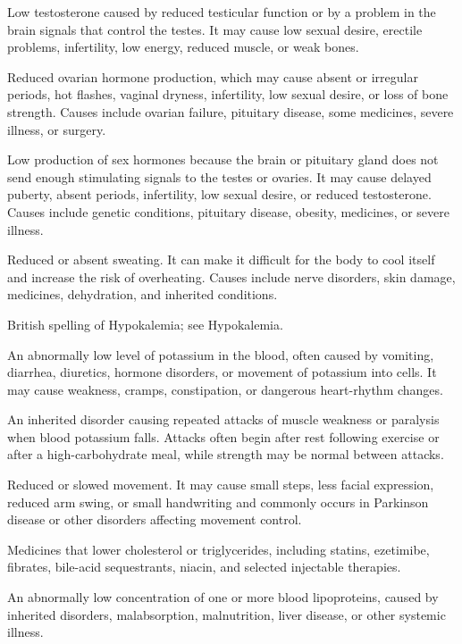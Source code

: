  Low testosterone caused by reduced testicular function or by a problem in the brain signals that control the testes. It may cause low sexual desire, erectile problems, infertility, low energy, reduced muscle, or weak bones.

 Reduced ovarian hormone production, which may cause absent or irregular periods, hot flashes, vaginal dryness, infertility, low sexual desire, or loss of bone strength. Causes include ovarian failure, pituitary disease, some medicines, severe illness, or surgery.

 Low production of sex hormones because the brain or pituitary gland does not send enough stimulating signals to the testes or ovaries. It may cause delayed puberty, absent periods, infertility, low sexual desire, or reduced testosterone. Causes include genetic conditions, pituitary disease, obesity, medicines, or severe illness.

 Reduced or absent sweating. It can make it difficult for the body to cool itself and increase the risk of overheating. Causes include nerve disorders, skin damage, medicines, dehydration, and inherited conditions.

 British spelling of Hypokalemia; see Hypokalemia.

 An abnormally low level of potassium in the blood, often caused by vomiting, diarrhea, diuretics, hormone disorders, or movement of potassium into cells. It may cause weakness, cramps, constipation, or dangerous heart-rhythm changes.

 An inherited disorder causing repeated attacks of muscle weakness or paralysis when blood potassium falls. Attacks often begin after rest following exercise or after a high-carbohydrate meal, while strength may be normal between attacks.

 Reduced or slowed movement. It may cause small steps, less facial expression, reduced arm swing, or small handwriting and commonly occurs in Parkinson disease or other disorders affecting movement control.

 Medicines that lower cholesterol or triglycerides, including statins, ezetimibe, fibrates, bile-acid sequestrants, niacin, and selected injectable therapies.

 An abnormally low concentration of one or more blood lipoproteins, caused by inherited disorders, malabsorption, malnutrition, liver disease, or other systemic illness.

